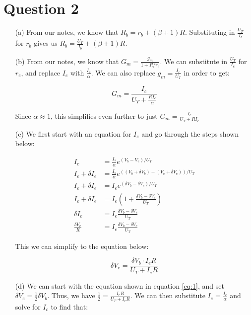 \documentclass{article}
\begin{document}
\section{Question 2}
\begin{itemize}
    \item[(a)] From our notes, we know that $R_b = r_b + (\beta + 1)R$. Substituting in $\frac{U_T}{I_b}$ for $r_b$ gives us $R_b = \frac{U_T}{I_b} + (\beta + 1)R$.

    \item[(b)] From our notes, we know that $G_m = \frac{g_m}{1 + R/r_e}$. We can substitute in $\frac{U_T}{I_e}$ for $r_e$, and replace $I_e$ with $\frac{I_c}{\alpha}$. We can also replace $g_m = \frac{I_c}{U_T}$ in order to get:
        
        \begin{equation*}
            G_m = \frac{ I_c }{ U_T + \frac{RI_c}{\alpha}}
        \end{equation*}

        Since $\alpha \approx 1$, this simplifies even further to just $G_m = \frac{ I_c }{ U_T + RI_c }$

    \item[(c)]
        We first start with an equation for $I_e$ and go through the steps shown below:

        \begin{align*}
            I_e &= \frac{I_s}{\alpha}e^{(V_b - V_e)/U_T}\\
            I_e + \delta I_e &= \frac{I_s}{\alpha}e^{( (V_b + \delta V_b) - (V_e + \delta V_e) )/U_T} \\
            I_e + \delta I_e &= I_ee^{(\delta V_b - \delta V_e)/U_T}\\
            I_e + \delta I_e &= I_e(1 + \frac{\delta V_b - \delta V_e}{U_T})\\
            \delta I_e &= I_e \frac{\delta V_b - \delta V_e}{U_T}\\
            \frac{\delta V_e}{R} &= I_e \frac{\delta V_b - \delta V_e}{U_T}
        \end{align*}

        This we can simplify to the equation below:

        \begin{equation} \label{eq:1}
            \delta V_e = \frac{\delta V_b \cdot I_e R}{U_T + I_e R}
        \end{equation}

    \item[(d)]
        We can start with the equation shown in equation \ref{eq:1}, and set $\delta V_e = \frac{1}{2} \delta V_b$. Thus, we have $\frac{1}{2} = \frac{I_e R}{U_T + I_e R}$. We can then substitute $I_e = \frac{I_c}{\alpha}$ and solve for $I_c$ to find that:


\end{itemize}
\end{document}
